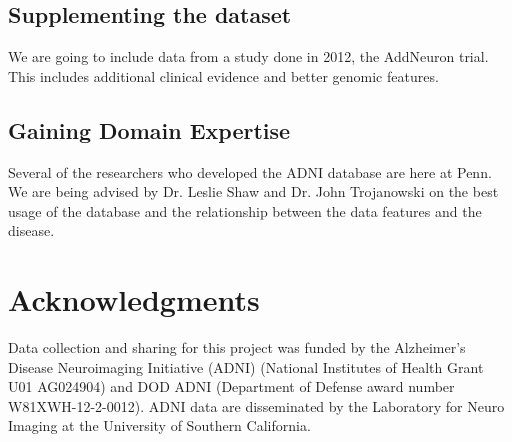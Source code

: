 \documentclass{article}
\begin{document}
\subsection{Supplementing the dataset}
We are going to include data from a study done in 2012, the AddNeuron trial. This includes additional clinical evidence and better genomic features.

\subsection{Gaining Domain Expertise}
Several of the researchers who developed the ADNI database are here at Penn. We are being advised by Dr. Leslie Shaw and Dr. John Trojanowski on the best usage of the database and the relationship between the data features and the disease.



%
%
%
%

 
\section*{Acknowledgments} 
 
Data collection and sharing for this project was funded by the Alzheimer's Disease Neuroimaging Initiative (ADNI) (National Institutes of Health Grant U01 AG024904) and DOD ADNI (Department of Defense award number W81XWH-12-2-0012). ADNI data are disseminated by the Laboratory for Neuro Imaging at the University of Southern California.



\end{document}
